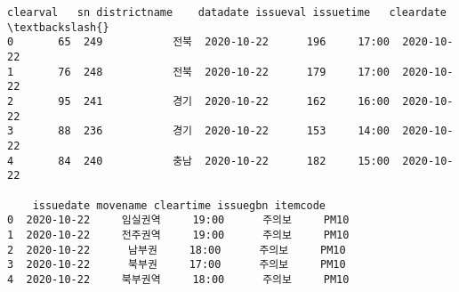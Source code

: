 \documentclass[11pt]{article}
\makeatletter
\newcommand{\boxspacing}{\kern\kvtcb@left@rule\kern\kvtcb@boxsep}
\newcommand{\prompt}[4]{
        {\ttfamily\llap{{\color{#2}[#3]:\hspace{3pt}#4}}\vspace{-\baselineskip}}
    }
\makeatother
\begin{document}
            \begin{tcolorbox}[breakable, size=fbox, boxrule=.5pt, pad at break*=1mm, opacityfill=0]
\prompt{Out}{outcolor}{4}{\boxspacing}
\begin{Verbatim}[commandchars=\\\{\}]
  clearval   sn districtname    datadate issueval issuetime   cleardate  \textbackslash{}
0       65  249           전북  2020-10-22      196     17:00  2020-10-22
1       76  248           전북  2020-10-22      179     17:00  2020-10-22
2       95  241           경기  2020-10-22      162     16:00  2020-10-22
3       88  236           경기  2020-10-22      153     14:00  2020-10-22
4       84  240           충남  2020-10-22      182     15:00  2020-10-22

    issuedate movename cleartime issuegbn itemcode
0  2020-10-22     임실권역     19:00      주의보     PM10
1  2020-10-22     전주권역     19:00      주의보     PM10
2  2020-10-22      남부권     18:00      주의보     PM10
3  2020-10-22      북부권     17:00      주의보     PM10
4  2020-10-22     북부권역     18:00      주의보     PM10
\end{Verbatim}
\end{tcolorbox}
        
\end{document}
